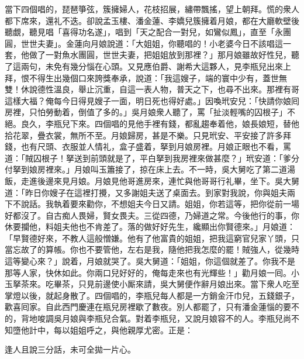 當下四個唱的，琵琶箏弦，簇擁婦人，花枝招展，繡帶飄搖，望上朝拜。慌的衆人都下席來，還礼不迭。卻說孟玉樓、潘金蓮、李嬌兒簇擁着月娘，都在大廳軟壁後聽覷，聽見唱「喜得功名遂」，唱到「天之配合一對兒，如鸞似鳳」，直至「永團圓，世世夫妻」。金蓮向月娘說道：「大姐姐，你聽唱的！小老婆今日不該唱這一套，{}他做了一對魚水團圓，世世夫妻，把姐姐放到那裡？」{}那月娘雖故好性兒，聽了這兩句，未免有幾分惱在心頭。又見應伯爵、謝希大這夥人，見李瓶兒出來上拜，恨不得生出幾個口來誇獎奉承，說道：「我這嫂子，端的寰中少有，蓋世無雙！休說德性溫良，舉止沉重，自這一表人物，普天之下，也尋不出來。那裡有哥這樣大福？俺每今日得見嫂子一面，明日死也得好處。」{}因喚玳安兒：「快請你娘囘房裡，只怕勞動着，倒值了多的。」吳月娘衆人聽了，罵「扯淡輕嘴的囚根子」不絕。良久，李瓶兒下來。四個唱的見他手裡有錢，都亂趨奉着他，娘長娘短，替他拾花翠，疊衣裳，無所不至。月娘歸房，甚是不樂。只見玳安、平安接了許多拜錢，也有尺頭、衣服並人情礼，盒子盛着，拏到月娘房裡。月娘正眼也不看，罵道：「賊囚根子！拏送到前頭就是了，平白拏到我房裡來做甚麼？」玳安道：「爹分付拏到娘房裡來。」{}月娘叫玉簫接了，掠在床上去。不一時，吳大舅吃了第二道湯飯，走進後邊來見月娘。月娘見他哥進房來，連忙與他哥哥行礼畢，坐下。吳大舅道：「昨日你嫂子在這裡打攪，又多謝姐夫送了桌面去。到家對我說，你與姐夫兩下不說話。我執着要來勸你，不想姐夫今日又請。姐姐，你若這等，把你從前一場好都沒了。自古痴人畏婦，賢女畏夫。三從四德，乃婦道之常。今後他行的事，你休要攔他，料姐夫他也不肯差了。落的做好好先生，纔顯出你賢德來。」{}月娘道：「早賢德好來，不教人這般憎嫌。他有了他富貴的姐姐，把我這窮官兒家丫頭，只當忘故了的算帳。你也不要管他，左右是我，隨他把我怎麼的罷！賊強人，從幾時這等變心來？」說着，月娘就哭了。吳大舅道：「姐姐，你這個就差了。你我不是那等人家，快休如此。你兩口兒好好的，俺每走來也有光輝些！」{}勸月娘一囘。小玉拏茶來。吃畢茶，只見前邊使小厮來請，吳大舅便作辭月娘出來。當下衆人吃至掌燈以後，就起身散了。四個唱的，李瓶兒每人都是一方銷金汗巾兒，五錢銀子，歡喜囘家。自此西門慶連在瓶兒房裡歇了數夜。別人都罷了，只有潘金蓮惱的要不的，背地唆調吳月娘與李瓶兒合氣。對着李瓶兒，又說月娘容不的人。李瓶兒尚不知墮他計中，每以姐姐呼之，與他親厚尤密。正是：

\begin{myquote} 
逢人且說三分話，未可全拋一片心。
\end{myquote} 

